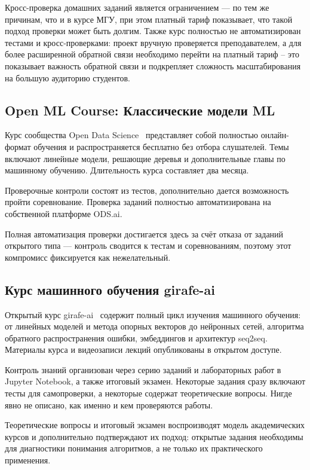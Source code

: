Кросс-проверка домашних заданий является ограничением --- по тем же причинам, что и в курсе МГУ, при этом платный тариф показывает, что такой подход проверки может быть долгим. Также курс полностью не автоматизирован тестами и кросс-проверками: проект вручную проверяется преподавателем, а для более расширенной обратной связи необходимо перейти на платный тариф -- это показывает важность обратной связи и подкрепляет сложность масштабирования на большую аудиторию студентов.

\subsection{Open ML Course: Классические модели ML}

Курс сообщества Open Data Science~\cite{ods_ml_course} представляет собой полностью онлайн-формат обучения и распространяется бесплатно без отбора слушателей. Темы включают линейные модели, решающие деревья и дополнительные главы по машинному обучению. Длительность курса составляет два месяца.

Проверочные контроли состоят из тестов, дополнительно дается возможность пройти соревнование. Проверка заданий полностью автоматизирована на собственной платформе ODS.ai.

Полная автоматизация проверки достигается здесь за счёт отказа от заданий открытого
типа --- контроль сводится к тестам и соревнованиям, поэтому этот компромисс
фиксируется как нежелательный.

\subsection{Курс машинного обучения girafe-ai}

Открытый курс girafe-ai~\cite{girafe_ai} содержит полный цикл изучения машинного обучения: от линейных моделей и метода опорных векторов до нейронных сетей, алгоритма обратного распространения ошибки, эмбеддингов и архитектур seq2seq. Материалы курса и видеозаписи лекций опубликованы в открытом доступе.

Контроль знаний организован через серию заданий и лабораторных работ в Jupyter Notebook, а также итоговый экзамен. Некоторые задания сразу включают тесты для самопроверки, а некоторые содержат теоретические вопросы. Нигде явно не описано, как именно и кем проверяются работы.

Теоретические вопросы и итоговый экзамен воспроизводят
модель академических курсов и дополнительно подтверждают их подход:
открытые задания необходимы для диагностики понимания алгоритмов, а не
только их практического применения.

